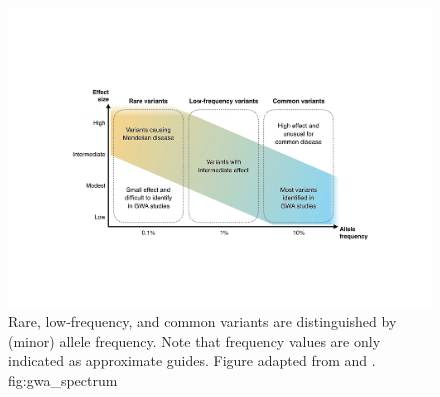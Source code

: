 

\begin{figure}[!htb]
\includegraphics[width=\textwidth]{./img/ch1/gwa_spectrum}
{Rare, low-frequency, and common variants are distinguished by (minor) allele frequency.
Note that frequency values are only indicated as approximate guides.
Figure adapted from \citet[][Box~7]{McCarthy:2008il} and \citet[][Figure~1]{Manolio:2009jp}.}
{fig:gwa_spectrum}
\end{figure}
